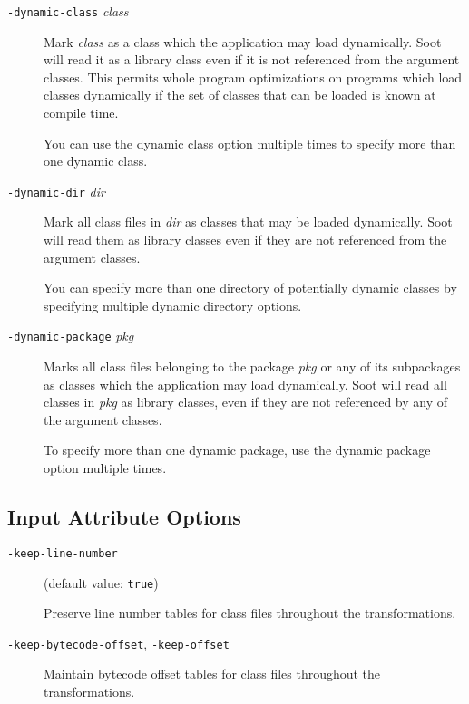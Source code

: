 \documentclass{article}
\begin{document}
\begin{description}
  \item[
  {\tt -dynamic-class}{ \it class}]


\par

Mark {\it class} as a class which the application may load
dynamically. Soot will read it as a library class even if it is
not referenced from the argument classes.  This permits whole
program optimizations on programs which load classes dynamically
if the set of classes that can be loaded is known at compile
time.

\par

You can use the dynamic class option multiple
times to specify more than one dynamic class.



  \item[
  {\tt -dynamic-dir}{ \it dir}]


\par
Mark all class files in {\it dir} as classes that may
be loaded dynamically. Soot will read them as library classes
even if they are not referenced from the argument classes. 

\par

You can specify more than one directory of potentially dynamic
classes by specifying multiple dynamic directory options.



  \item[
  {\tt -dynamic-package}{ \it pkg}]


\par

Marks all class files belonging to the package {\it pkg}
or any of its subpackages as classes which the application may
load dynamically. Soot will read all classes in {\it pkg} as
library classes, even if they are not referenced by any of the
argument classes. 

\par
To specify more than one dynamic package, use the dynamic
package option multiple times.



\end{description}


\subsection{Input Attribute Options}


\begin{description}

  \item[
  {\tt -keep-line-number}]

(default value: {\tt true})

Preserve line number tables for class files throughout the
transformations.



  \item[
  {\tt -keep-bytecode-offset}, 
  {\tt -keep-offset}]
Maintain bytecode offset tables for class files throughout the transformations.


\end{description}
\end{document}
